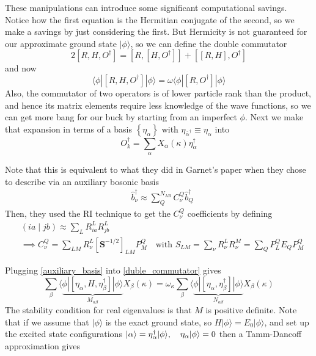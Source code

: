 These manipulations can introduce some significant computational savings. Notice how the first equation is the Hermitian conjugate of the second, so we make a savings by just considering the first. But Hermicity is not guaranteed for our approximate ground state $|\phi\rangle$, so we can define the double commutator
\begin{equation}
    2\left[R, H, O^{\dagger}\right]=\left[R,\left[H, O^{\dagger}\right]\right]+\left[[R, H], O^{\dagger}\right] 
\end{equation}
and now
\begin{equation}
    \langle\phi|\left[R, H, O^{\dagger}\right]|\phi\rangle=\omega\langle\phi|\left[R, O^{\dagger}\right]|\phi\rangle
\label{duble_commutator}
\end{equation}
Also, the commutator of two operators is of lower particle rank than the product, and hence its matrix elements require less knowledge of the wave functions, so we can get more bang for our buck by starting from an imperfect $\phi$. Next we make that expansion in terms of a basis $\left\{\eta_\alpha\right\}$ with $
\eta_{\bar{\alpha}^{\dagger}} \equiv \eta_\alpha
$ into
\begin{equation}
    O_k^{\dagger}=\sum_\alpha X_\alpha(\kappa) \eta_\alpha^{\dagger}
\label{auxiliary_basis}
\end{equation}
\begin{tcolorbox}[colback=red!10!white, colframe=red!50!black, title=Equivalence to what Garnet did]
Note that this is equivalent to what they did in Garnet's paper when they chose to describe via an auxiliary bosonic basis
\begin{equation}
\begin{aligned}
& \hat{b}_\nu^{\dagger} \approx \sum_Q^{N_{\mathrm{AB}}} C_\nu^Q \hat{b}_Q^{\dagger}
\end{aligned}
\end{equation}
Then, they used the RI technique to get the $C_\nu^Q$ coefficients by defining
\begin{align}
&(i a \mid j b) \approx \sum_L R_{i a}^L R_{j b}^L\\
&\implies C_\nu^Q=\sum_{L M} R_\nu^L\left[\mathbf{S}^{-1 / 2}\right]_{L M} P_M^Q \quad \text{with } S_{L M}=\sum_\nu R_\nu^L R_\nu^M=\sum_Q P_L^Q E_Q P_M^Q
\end{align}
\end{tcolorbox}
Plugging \ref{auxiliary_basis} into \ref{duble_commutator} gives
\begin{equation}
    \sum_\beta\langle\underbrace{\phi|\left[\eta_\alpha, H, \eta_\beta^{\dagger}\right]|\phi\rangle}_{M_{\alpha \beta}} X_\beta(\kappa) =\omega_\kappa \sum_\beta\langle\underbrace{\phi|\left[\eta_\alpha, \eta_\beta^{\dagger}\right]|\phi\rangle}_{N_{\alpha \beta}} X_\beta(\kappa)
\label{eq:matrix_equation_nobasis}
\end{equation}
The stability condition for real eigenvalues is that $M$ is positive definite. Note that if we assume that $| \phi\rangle$ is the exact ground state, so $H|\phi\rangle=E_0|\phi\rangle$, and set up the excited state configurations $\ket{\alpha}= \eta_\alpha^{\dagger} |\phi\rangle, \quad \eta_\alpha | \phi\rangle = 0$ then a Tamm-Dancoff approximation gives

